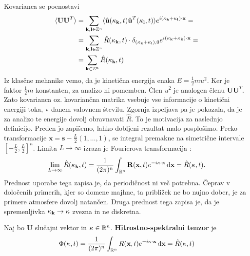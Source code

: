 \documentclass[mat2, tisk]{fmfdelo}
\newcommand{\R}{\mathbb R}
\newcommand{\Z}{\mathbb Z}
\newcommand{\bd}{\textbf}
\begin{document}
Kovarianca se poenostavi 
\begin{align*}
\langle \bd{U} \bd{U}^T\rangle &= \sum_{\bd{k}, \bd{l}\in \Z^{n}} \langle \hat{\bd{u}}(\bd{\text{$\kappa$}}_\bd{k}, t) \hat{\bd{u}}^T(\bd{\text{$\kappa$}}_\bd{l}, t) \rangle e^{i(\bd{\text{$\kappa$}}_\bd{k} + \bd{\text{$\kappa$}}_\bd{l})\cdot \bd{x}} = \\
&= \sum_{\bd{k}, \bd{l}\in \Z^{n}} \hat{R}(\text{\bd{$\kappa$}}_{\bd{k}}, t) \cdot \delta_{(\bd{\text{$\kappa$}}_{\bd{k}} + \bd{\text{$\kappa$}}_{\bd{l}}), 0} e^{i(\bd{\text{$\kappa$}}_\bd{k} + \bd{\text{$\kappa$}}_\bd{k})\cdot \bd{x}} = \\
&= \sum_{\bd{k}\in \Z^{n}} \hat{R}(\text{\bd{$\kappa$}}_{\bd{k}}, t)
\end{align*}
Iz klasčne mehanike vemo, da je kinetična energija enaka $E = \frac{1}{2} m u^2$. Ker je
faktor $\frac{1}{2} m$ konstanten, za analizo ni pomemben. Člen $u^2$ je analogen členu $\bd{U} \bd{U}^T$. 
Zato kovarianca oz. kovariančna matrika vsebuje vse informacije o kinetični energiji toka, 
v danem valovnem številu.
Zgornja izpeljava pa je pokazala, da je za analizo te energije dovolj obravnavati 
$\hat{R}$. To je motivacija za naslednjo definicijo. Preden jo zapišemo, 
lahko dobljeni rezultat malo posplošimo. Preko transformacije $\bd{x} = \bd{s} - \frac{L}{2}(1, \dots, 1)$, 
se integral premakne na simetrične intervale 
$\left[-\frac{L}{2}, \frac{L}{2}\right]^n$. Limita $L \rightarrow \infty$ izraza je 
Fourierova transformacija :
\begin{align*}
\lim_{L\rightarrow \infty} \hat{R}(\bd{\text{$\kappa$}}_{\bd{k}}, t) = \frac{1}{(2\pi)^n}\int_{\R^n} \bd{R}(\bd{x}, t) e^{-i\text{\bd{$\kappa$}} \cdot \bd{x}} \dif \bd{x} = \hat{R}(\bd{\text{$\kappa$}}, t).
\end{align*}
Prednost uporabe tega zapisa je, da periodičnost ni več potrebna. Čeprav
v določenih primerih, kjer so domene majhne, ta približek ne bo nujno dober, 
je za primere atmosfere dovolj natančen. Druga prednost tega zapisa je, da je 
spremenljivka $\bd{\text{$\kappa$}}_{\bd{k}} \rightarrow \bd{\text{$\kappa$}}$
zvezna in ne diskretna.

\begin{definicija}
Naj bo $\bd{U}$ slučajni vektor in $\text{\bd{$\kappa$}} \in \R^n$. \bd{Hitrostno-spektralni tenzor} je 
\begin{equation}
\Phi(\text{\bd{$\kappa$}}, t) = \frac{1}{(2\pi)^n}\int_{\R^n} {R}(\bd{x}, t) e^{-i\text{\bd{$\kappa$}} \cdot \bd{x}} \dif \bd{x} = \hat{R}(\bd{\text{$\kappa$}}, t)
\end{equation}
\end{definicija}
\end{document}
